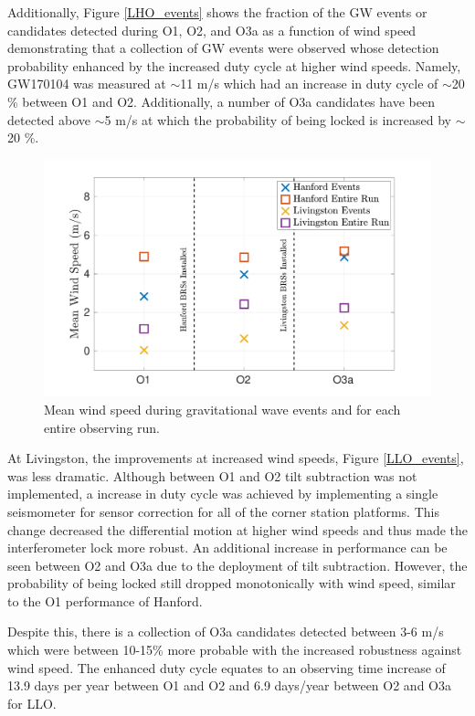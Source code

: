 \documentclass [12pt, proquest]{uwthesis}[2019]
\begin{document}
Additionally, Figure \ref{LHO_events} shows the fraction of the GW events or candidates detected during O1, O2, and O3a as a function of wind speed demonstrating that a collection of GW events were observed whose detection probability enhanced by the increased duty cycle at higher wind speeds. Namely, GW170104 was measured at $\sim$11 m/s which had an increase in duty cycle of $\sim$20 \% between O1 and O2. Additionally, a number of O3a candidates have been detected above $\sim$5 m/s at which the probability of being locked is increased by $\sim$20 \%.


\begin{figure}[!h]
\begin{center}
\includegraphics[width=\textwidth]{WindExpect.pdf}
\caption[Mean wind speed during GW events]{Mean wind speed during gravitational wave events and for each entire observing run.}
\label{WindExp}
\end{center}
\end{figure}

At Livingston, the improvements at increased wind speeds, Figure \ref{LLO_events}, was less dramatic. Although between O1 and O2 tilt subtraction was not implemented, a increase in duty cycle was achieved by implementing a single seismometer for sensor correction for all of the corner station platforms. This change decreased the differential motion at higher wind speeds and thus made the interferometer lock more robust. An additional increase in performance can be seen between O2 and O3a due to the deployment of tilt subtraction. However, the probability of being locked still dropped monotonically with wind speed, similar to the O1 performance of Hanford.

Despite this, there is a collection of O3a candidates detected between 3-6 m/s which were between 10-15\% more probable with the increased robustness against wind speed. The enhanced duty cycle equates to an observing time increase of 13.9 days per year between O1 and O2 and 6.9 days/year between O2 and O3a for LLO.
\end{document}
